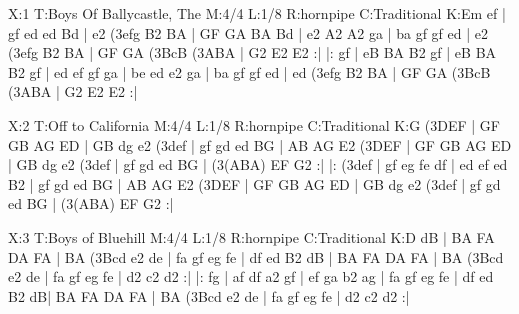 \documentclass[a4paper]{article}
\begin{document}
    \begin{abc}[name=c-dur]
		
		X:1
		T:Boys Of Ballycastle, The
		M:4/4
		L:1/8
		R:hornpipe
		C:Traditional
		K:Em
		ef | gf ed ed Bd | e2 (3efg B2 BA | GF GA BA Bd | e2 A2 A2 ga |
		ba gf gf ed | e2 (3efg B2 BA | GF GA (3BcB (3ABA | G2 E2 E2 :|
		|: gf | eB BA B2 gf | eB BA B2 gf | ed ef gf ga | be ed e2 ga  |
		ba gf gf ed | ed (3efg B2 BA | GF GA (3BcB (3ABA | G2 E2 E2 :|
		
		X:2
		T:Off to California
		M:4/4
		L:1/8
		R:hornpipe
		C:Traditional
		K:G
		(3DEF | GF GB AG ED | GB dg e2 (3def | gf gd ed BG | AB AG E2 (3DEF |
		GF GB AG ED | GB dg e2 (3def | gf gd ed BG | (3(ABA) EF G2 :|
		|: (3def | gf eg fe df | ed ef ed B2 | gf gd ed BG | AB AG E2 (3DEF |
		GF GB AG ED | GB dg e2 (3def | gf gd ed BG | (3(ABA) EF G2 :|
		
		X:3
		T:Boys of Bluehill
		M:4/4
		L:1/8
		R:hornpipe
		C:Traditional
		K:D
		dB | BA FA DA FA | BA (3Bcd e2 de | fa gf eg fe | df ed B2 dB |
		BA FA DA FA | BA (3Bcd e2 de | fa gf eg fe | d2 c2 d2 :|
		|: fg | af df a2 gf | ef ga b2 ag | fa gf eg fe | df ed B2 dB|
		BA FA DA FA | BA (3Bcd e2 de | fa gf eg fe | d2 c2 d2 :|
    \end{abc}
\end{document}
